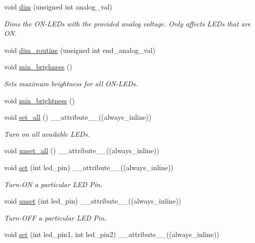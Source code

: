 \begin{DoxyCompactItemize}
\item 
void \hyperlink{classLEDSet_a70e49efcd898014cb18b973b7f42b0fa}{dim} (unsigned int analog\+\_\+val)
\begin{DoxyCompactList}\small\item\em Dims the O\+N-\/\+L\+E\+Ds with the provided analog voltage. Only affects L\+E\+Ds that are ON. \end{DoxyCompactList}\item 
void \hyperlink{classLEDSet_a7b8c21a6888b762a42ee3292ddc6bba9}{dim\+\_\+routine} (unsigned int end\+\_\+analog\+\_\+val)
\item 
void \hyperlink{classLEDSet_ab0b5216d009c92273505d4f055f4676f}{min\+\_\+brighness} ()
\begin{DoxyCompactList}\small\item\em Sets maximum brightness for all O\+N-\/\+L\+E\+Ds. \end{DoxyCompactList}\item 
void \hyperlink{classLEDSet_a2f050dc20669252885e36f26a3af6a1d}{min\+\_\+brightness} ()
\item 
void \hyperlink{classLEDSet_a9d54d89134276744267b15d362debf44}{set\+\_\+all} () \+\_\+\+\_\+attribute\+\_\+\+\_\+((always\+\_\+inline))
\begin{DoxyCompactList}\small\item\em Turn on all available L\+E\+Ds. \end{DoxyCompactList}\item 
void \hyperlink{classLEDSet_ae30b2c6d69caeada476829be609b95c2}{unset\+\_\+all} () \+\_\+\+\_\+attribute\+\_\+\+\_\+((always\+\_\+inline))
\item 
void \hyperlink{classLEDSet_a187d19565bbb09a168635b384acc5dd7}{set} (int led\+\_\+pin) \+\_\+\+\_\+attribute\+\_\+\+\_\+((always\+\_\+inline))
\begin{DoxyCompactList}\small\item\em Turn-\/\+ON a particular L\+ED Pin. \end{DoxyCompactList}\item 
void \hyperlink{classLEDSet_abfee31b85b957577a7ec07e101a36c8b}{unset} (int led\+\_\+pin) \+\_\+\+\_\+attribute\+\_\+\+\_\+((always\+\_\+inline))
\begin{DoxyCompactList}\small\item\em Turn-\/\+O\+FF a particular L\+ED Pin. \end{DoxyCompactList}\item 
void \hyperlink{classLEDSet_a8462339dbc47f4d979c9f783b8532d4f}{set} (int led\+\_\+pin1, int led\+\_\+pin2) \+\_\+\+\_\+attribute\+\_\+\+\_\+((always\+\_\+inline))

\end{DoxyCompactItemize}
